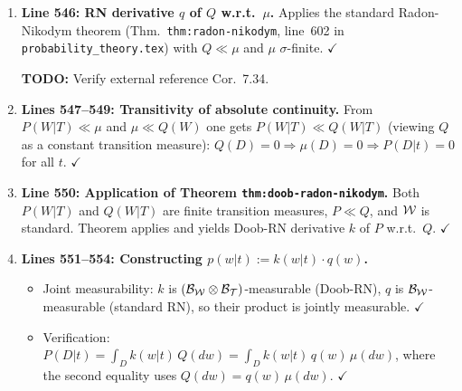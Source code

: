\documentclass{article}
\begin{document}
\begin{enumerate}[leftmargin=*]
\begin{itemize}
            mathematical argument: only the mutual absolute continuity
            $Q \ll \mu \ll Q$ and finiteness of~$Q$ are used, not
            $Q(\Wcal)=1$.  But strictly speaking, the claim ``probability
            measure'' may be incorrect depending on convention.
      \item The disjoint decomposition $\Wcal = \bigsqcup_{n} \Wcal_n$ with
            $0 < \mu(\Wcal_n) < \infty$ is obtained from a standard
            $\sigma$-finite covering by making it disjoint and discarding
            zero-measure pieces (the discarded union has $\mu$-measure zero).
            $\checkmark$
    \end{itemize}

  \item \textbf{Line 546: RN derivative $q$ of $Q$ w.r.t.\ $\mu$.}
    Applies the standard Radon-Nikodym theorem (Thm.\ \texttt{thm:radon-nikodym},
    line~602 in \texttt{probability\_theory.tex}) with $Q \ll \mu$ and $\mu$
    $\sigma$-finite.  $\checkmark$

    \textbf{TODO:} Verify external reference \cite{Kle20} Cor.\ 7.34.

  \item \textbf{Lines 547--549: Transitivity of absolute continuity.}
    From $P(W|T) \ll \mu$ and $\mu \ll Q(W)$ one gets $P(W|T) \ll Q(W|T)$
    (viewing $Q$ as a constant transition measure):
    $Q(D)=0 \Rightarrow \mu(D)=0 \Rightarrow P(D|t)=0$ for all $t$.  $\checkmark$

  \item \textbf{Line 550: Application of Theorem \texttt{thm:doob-radon-nikodym}.}
    Both $P(W|T)$ and $Q(W|T)$ are finite transition measures,
    $P \ll Q$, and $\mathcal{W}$ is standard.
    Theorem applies and yields Doob-RN derivative $k$ of $P$ w.r.t.\ $Q$.
    $\checkmark$

  \item \textbf{Lines 551--554: Constructing $p(w|t) := k(w|t)\cdot q(w)$.}
    \begin{itemize}
      \item Joint measurability: $k$ is $(\mathcal{B}_{\mathcal{W}}\otimes\mathcal{B}_{\mathcal{T}})$-measurable
            (Doob-RN), $q$ is $\mathcal{B}_{\mathcal{W}}$-measurable (standard RN), so their
            product is jointly measurable.  $\checkmark$
      \item Verification:
            $P(D|t) = \int_D k(w|t)\,Q(dw) = \int_D k(w|t)\,q(w)\,\mu(dw)$,
            where the second equality uses $Q(dw) = q(w)\,\mu(dw)$.  $\checkmark$
    \end{itemize}


\end{enumerate}
\end{document}
